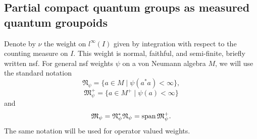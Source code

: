 \subsection{Partial compact quantum groups as measured quantum groupoids}




Denote by $\nu$ the weight on $l^{\infty}(I)$ given by
integration with respect to the counting measure on $I$. This weight is
normal, faithful, and semi-finite,  briefly written nsf. For general nsf weights $\psi$ on a von Neumann algebra $M$, we will use the standard notation \[\mathfrak{N}_{\psi} = \{a\in M\mid \psi(a^*a)<\infty\},\]\[\mathfrak{M}_{\psi}^+  = \{a\in M^+\mid\psi(a)<\infty\}\] and \[\mathfrak{M}_{\psi} = \mathfrak{N}_{\psi}^*\mathfrak{N}_{\psi} = \operatorname{\mathrm{span}} \mathfrak{M}_{\psi}^+.\] The same notation will be used for operator valued weights.

